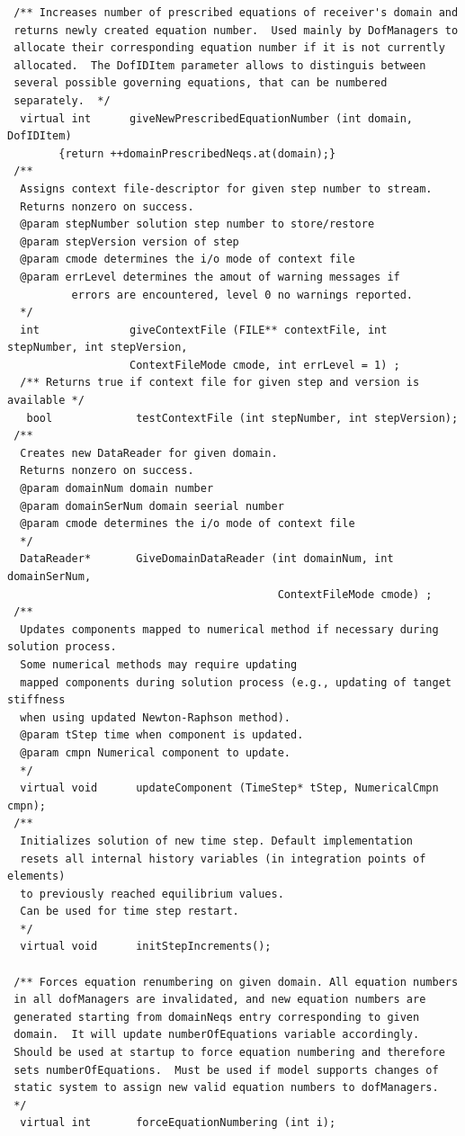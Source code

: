 \documentclass[a4paper]{article}
\begin{document}
{\begin{verbatim}
 /** Increases number of prescribed equations of receiver's domain and
 returns newly created equation number.  Used mainly by DofManagers to
 allocate their corresponding equation number if it is not currently
 allocated.  The DofIDItem parameter allows to distinguis between
 several possible governing equations, that can be numbered
 separately.  */
  virtual int      giveNewPrescribedEquationNumber (int domain, DofIDItem) 
        {return ++domainPrescribedNeqs.at(domain);}
 /** 
  Assigns context file-descriptor for given step number to stream.
  Returns nonzero on success.
  @param stepNumber solution step number to store/restore
  @param stepVersion version of step
  @param cmode determines the i/o mode of context file
  @param errLevel determines the amout of warning messages if
          errors are encountered, level 0 no warnings reported.
  */
  int              giveContextFile (FILE** contextFile, int stepNumber, int stepVersion, 
                   ContextFileMode cmode, int errLevel = 1) ;
  /** Returns true if context file for given step and version is available */
   bool             testContextFile (int stepNumber, int stepVersion);
 /** 
  Creates new DataReader for given domain.
  Returns nonzero on success.
  @param domainNum domain number
  @param domainSerNum domain seerial number
  @param cmode determines the i/o mode of context file
  */
  DataReader*       GiveDomainDataReader (int domainNum, int domainSerNum, 
                                          ContextFileMode cmode) ;
 /**
  Updates components mapped to numerical method if necessary during solution process.
  Some numerical methods may require updating
  mapped components during solution process (e.g., updating of tanget stiffness
  when using updated Newton-Raphson method). 
  @param tStep time when component is updated.
  @param cmpn Numerical component to update.
  */
  virtual void      updateComponent (TimeStep* tStep, NumericalCmpn cmpn);
 /**
  Initializes solution of new time step. Default implementation
  resets all internal history variables (in integration points of elements)
  to previously reached equilibrium values.
  Can be used for time step restart.
  */
  virtual void      initStepIncrements();

 /** Forces equation renumbering on given domain. All equation numbers
 in all dofManagers are invalidated, and new equation numbers are
 generated starting from domainNeqs entry corresponding to given
 domain.  It will update numberOfEquations variable accordingly.
 Should be used at startup to force equation numbering and therefore
 sets numberOfEquations.  Must be used if model supports changes of
 static system to assign new valid equation numbers to dofManagers.
 */
  virtual int       forceEquationNumbering (int i);


\end{verbatim}}
\end{document}
